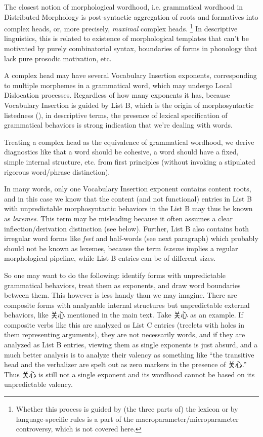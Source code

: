 \documentclass[UTF8, a4paper, oneside, scheme=plain, 12pt]{ctexrep}
\newcommand*{\term}[1]{\emph{#1}}
\newcommand{\form}[1]{\emph{#1}}
\begin{document}
{The closest notion of morphological wordhood, i.e. grammatical wordhood in Distributed Morphology is 
post-syntactic aggregation of roots and formatives into complex heads,
or, more precisely, \emph{maximal} complex heads.%
\footnote{
    Whether this process is guided by (the three parts of) the lexicon or by language-specific rules is a part of the macroparameter/microparameter controversy, which is not covered here.
} 
In descriptive linguistics, this is related to existence of morphological templates that can't be motivated by purely combinatorial syntax,
boundaries of forms in phonology that lack pure prosodic motivation, etc.

A complex head may have several Vocabulary Insertion exponents, corresponding to multiple morphemes in a grammatical word, which may undergo Local Dislocation processes.
Regardless of how many exponents it has, because Vocabulary Insertion is guided by List B, which is the origin of morphosyntactic listedness (),
in descriptive terms, the presence of lexical specification of grammatical behaviors is strong indication that we're dealing with words.

Treating a complex head as the equivalence of grammatical wordhood, we derive diagnostics like that a word should be cohesive, a word should have a fixed, simple internal structure, etc. from first principles (without invoking a stipulated rigorous word/phrase distinction).

In many words, only one Vocabulary Insertion exponent contains content roots, 
and in this case we know that the content (and not functional) entries in List B
with unpredictable morphosyntactic behaviors in the List B may thus be known as \term{lexemes}.
This term may be misleading because it often assumes a clear inflection/derivation distinction (see below).
Further, List B also contains both irregular word forms like \form{feet} and half-words (see next paragraph) which probably should not be known as lexemes, because the term \term{lexeme} implies a regular morphological pipeline, while List B entries can be of different sizes.

So one may want to do the following:
identify forms with unpredictable grammatical behaviors, treat them as exponents, and draw word boundaries between them.
This however is less handy than we may imagine. 
There are composite forms with analyzable internal structures but unpredictable external behaviors, like 关心 mentioned in the main text. 
Take 关心 as an example. If composite verbs like this are analyzed as List C entries (treelets with holes in them representing arguments), they are not necessarily words, and if they are analyzed as List B entries, viewing them as single exponents is just absurd, and a much better analysis is to analyze their valency as something like ``the transitive head and the verbalizer are spelt out as zero markers in the presence of 关心.''
Thus 关心 is still not a single exponent and its wordhood cannot be based on its unpredictable valency.

}
\end{document}
